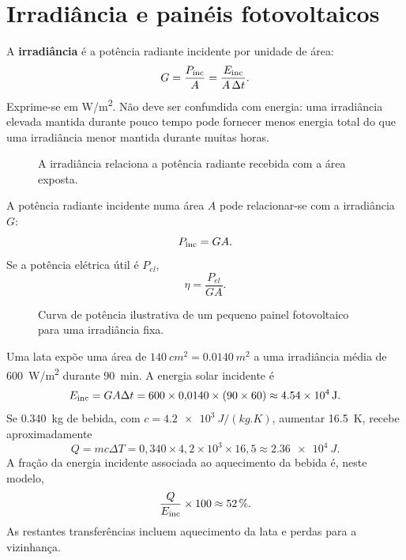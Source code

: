 \documentclass[11pt,a4paper,oneside]{book}
\begin{document}
\section{Irradiância e painéis fotovoltaicos}
A \textbf{irradiância} é a potência radiante incidente por unidade de área:
\[
G=\frac{P_{\rm inc}}{A}=\frac{E_{\rm inc}}{A\,\Delta t}.
\]
Exprime-se em \si{W/m^2}. Não deve ser confundida com energia: uma irradiância elevada mantida durante pouco tempo pode fornecer menos energia total do que uma irradiância menor mantida durante muitas horas.

\begin{figure}[H]
\centering
{}
\caption{A irradiância relaciona a potência radiante recebida com a área exposta.}
\end{figure}

A potência radiante incidente numa área $A$ pode relacionar-se com a irradiância $G$:
\[
P_{\rm inc}=GA.
\]
Se a potência elétrica útil é $P_{el}$,
\[
\eta=\frac{P_{el}}{GA}.
\]

\begin{figure}[H]
\centering
{}
\caption{Curva de potência ilustrativa de um pequeno painel fotovoltaico para uma irradiância fixa.}
\end{figure}


\begin{exemplo}[title=Exemplo resolvido -- energia solar recebida e aquecimento]
Uma lata expõe uma área de $\SI{140}{cm^2}=\SI{0.0140}{m^2}$ a uma irradiância média de \SI{600}{W/m^2} durante \SI{90}{min}. A energia solar incidente é
\[
E_{\rm inc}=GA\Delta t=600\times0{,}0140\times(90\times60)
\approx\SI{4.54e4}{J}.
\]
Se \SI{0.340}{kg} de bebida, com $c=\SI{4.2e3}{J/(kg.K)}$, aumentar \SI{16.5}{K}, recebe aproximadamente
\[
Q=mc\Delta T=0{,}340\times4{,}2\times10^3\times16{,}5
\approx\SI{2.36e4}{J}.
\]
A fração da energia incidente associada ao aquecimento da bebida é, neste modelo,
\[
\frac{Q}{E_{\rm inc}}\times100\approx\SI{52}{\percent}.
\]
As restantes transferências incluem aquecimento da lata e perdas para a vizinhança.
\end{exemplo}
\end{document}
